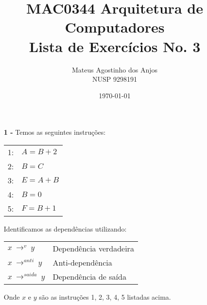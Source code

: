 \documentclass[12pt]{article}
\title{MAC0344 Arquitetura de Computadores\\
Lista de Exercícios No. 3
}
\author{Mateus Agostinho dos Anjos\\NUSP 9298191}
\date{\today}
\begin{document}
	\maketitle
	\begin{itemize}
		\item[\textbf{1 -}]
			\hfill\newline
			Temos as seguintes instruções:		
			\begin{center}
				\begin{tabular}{cl}
					1: & $A = B + 2$\\
					2: & $B = C$\\
					3: & $E = A + B$\\
					4: & $B = 0$\\
					5: & $F = B + 1$\\				
				\end{tabular}			
			\end{center}
			Identificamos as dependências utilizando:\\
			\begin{center}
				\begin{tabular}{ll}
			$x \ \longrightarrow^v \ y$ & Dependência verdadeira\\
			$x \ \longrightarrow^{anti} \ y$ & Anti-dependência\\
			$x \ \longrightarrow^{saida} \ y$ & Dependência de saída\\		
				\end{tabular}			
			\end{center}
			Onde $x$ e $y$ são as instruções {1, 2, 3, 4, 5} listadas
			acima.\\
			

\end{itemize}
\end{document}
